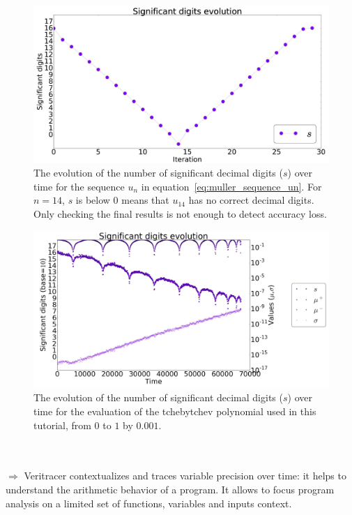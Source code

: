 \documentclass{TP}
\begin{document}
 \begin{figure}[h!]
  \centering\includegraphics[width=0.8\linewidth]{muller_sequence_un.jpg}
  \caption{The evolution of the number of significant decimal digits ($s$) over time
     for the sequence $u_n$ in equation~\ref{eq:muller_sequence_un}.
    For $n=14$, $s$ is below 0 means that $u_{14}$ has no correct decimal digits.
     Only checking the final results is not enough to detect accuracy loss.
  }

 \label{fig:muller_sequence_un}
 \end{figure}
%
%
\begin{figure}[h!]
  \centering\includegraphics[width=1\linewidth]{tcheby_veritracer_large_font.jpg}
 \caption{The evolution of the number of significant decimal digits ($s$) over time
     for the evaluation of the tchebytchev polynomial used in this tutorial, from $0$ to $1$ by $0.001$.
  }
 \label{fig:veritcheby}
 \end{figure}
%
%
 ~\\~\\$\Rightarrow$ Veritracer contextualizes and traces variable precision over time: it helps to understand the arithmetic behavior of a program. It allows to focus program analysis on a limited set of functions, variables and inputs context.
%
\end{document}
